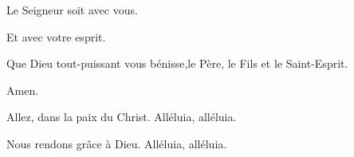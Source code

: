 \pr Le Seigneur soit avec vous.

\be Et avec votre esprit.

\pr Que Dieu tout-puissant vous bénisse,le Père, le Fils et le Saint-Esprit.

\be Amen.

\pr Allez, dans la paix du Christ. Alléluia, alléluia.

\be Nous rendons grâce à Dieu. Alléluia, alléluia.